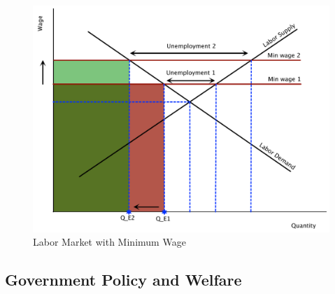 \documentclass[addpoints,11pt]{exam}
\theoremstyle{definition}
\begin{document}
\begin{questions}
\begin{parts}
\begin{solution}
			\begin{figure}[H]
						\centering
						\includegraphics[scale=.45]{hw3_plot3.pdf}
						\caption{Labor Market with Minimum Wage}
						\label{fig4}
			\end{figure}
					
		\end{solution}
		
	\end{parts}
	
	
\end{questions}

\newpage

\subsection*{Government Policy and Welfare}
\end{document}
